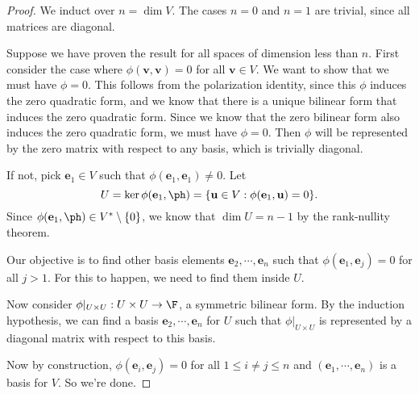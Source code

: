 \documentclass[a4paper]{article}
\begin{document}
\begin{proof}
  We induct over $n = \dim V$. The cases $n = 0$ and $n = 1$ are trivial, since all matrices are diagonal.

  Suppose we have proven the result for all spaces of dimension less than $n$. First consider the case where $\phi(\mathbf{v}, \mathbf{v}) = 0$ for all $\mathbf{v} \in V$. We want to show that we must have $\phi = 0$. This follows from the polarization identity, since this $\phi$ induces the zero quadratic form, and we know that there is a unique bilinear form that induces the zero quadratic form. Since we know that the zero bilinear form also induces the zero quadratic form, we must have $\phi = 0$. Then $\phi$ will be represented by the zero matrix with respect to any basis, which is trivially diagonal.

  If not, pick $\mathbf{e}_1 \in V$ such that $\phi(\mathbf{e}_1, \mathbf{e}_1) \not= 0$. Let
  \[
    U = \ker \phi(\mathbf{e}_1, \ph) = \{\mathbf{u} \in V: \phi(\mathbf{e}_1, \mathbf{u}) = 0\}.
  \]
  Since $\phi(\mathbf{e}_1, \ph) \in V^* \setminus \{0\}$, we know that $\dim U = n - 1$ by the rank-nullity theorem.

  Our objective is to find other basis elements $\mathbf{e}_2, \cdots, \mathbf{e}_n$ such that $\phi(\mathbf{e}_1, \mathbf{e}_j) = 0$ for all $j > 1$. For this to happen, we need to find them inside $U$.

  Now consider $\phi|_{U\times U}: U\times U \to \F$, a symmetric bilinear form. By the induction hypothesis, we can find a basis $\mathbf{e}_2, \cdots, \mathbf{e}_n$ for $U$ such that $\phi|_{U\times U}$ is represented by a diagonal matrix with respect to this basis.

  Now by construction, $\phi(\mathbf{e}_i, \mathbf{e}_j) = 0$ for all $1 \leq i \not= j \leq n$ and $(\mathbf{e}_1, \cdots, \mathbf{e}_n)$ is a basis for $V$. So we're done.
\end{proof}
\end{document}
